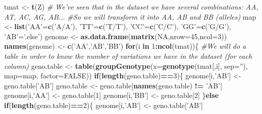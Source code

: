\documentclass[]{article}
\newenvironment{Shaded}{\begin{snugshade}}{\end{snugshade}}
\newcommand{\KeywordTok}[1]{\textcolor[rgb]{0.13,0.29,0.53}{\textbf{#1}}}
\newcommand{\DataTypeTok}[1]{\textcolor[rgb]{0.13,0.29,0.53}{#1}}
\newcommand{\DecValTok}[1]{\textcolor[rgb]{0.00,0.00,0.81}{#1}}
\newcommand{\StringTok}[1]{\textcolor[rgb]{0.31,0.60,0.02}{#1}}
\newcommand{\CommentTok}[1]{\textcolor[rgb]{0.56,0.35,0.01}{\textit{#1}}}
\newcommand{\OtherTok}[1]{\textcolor[rgb]{0.56,0.35,0.01}{#1}}
\newcommand{\ControlFlowTok}[1]{\textcolor[rgb]{0.13,0.29,0.53}{\textbf{#1}}}
\newcommand{\OperatorTok}[1]{\textcolor[rgb]{0.81,0.36,0.00}{\textbf{#1}}}
\newcommand{\NormalTok}[1]{#1}
\begin{document}
\begin{Shaded}
\begin{Highlighting}[]
\NormalTok{tmat <-}\StringTok{ }\KeywordTok{t}\NormalTok{(Z)}
\CommentTok{# We've seen that in the dataset we have several combinations: AA, AT, AC, AG, AB...}
\CommentTok{#So we will transform it into AA, AB and BB (alleles)}
\NormalTok{map <-}\StringTok{ }\KeywordTok{list}\NormalTok{(}\StringTok{'AA'}\NormalTok{=}\KeywordTok{c}\NormalTok{(}\StringTok{'A/A'}\NormalTok{), }\StringTok{'TT'}\NormalTok{=}\KeywordTok{c}\NormalTok{(}\StringTok{'T/T'}\NormalTok{), }\StringTok{'CC'}\NormalTok{=}\KeywordTok{c}\NormalTok{(}\StringTok{'C/C'}\NormalTok{), }\StringTok{'GG'}\NormalTok{=}\KeywordTok{c}\NormalTok{(}\StringTok{'G/G'}\NormalTok{), }\StringTok{'AB'}\NormalTok{=}\StringTok{'.else'}\NormalTok{)}
\NormalTok{genome <-}\StringTok{ }\KeywordTok{as.data.frame}\NormalTok{(}\KeywordTok{matrix}\NormalTok{(}\OtherTok{NA}\NormalTok{,}\DataTypeTok{nrow=}\DecValTok{45}\NormalTok{,}\DataTypeTok{ncol=}\DecValTok{3}\NormalTok{))}
\KeywordTok{names}\NormalTok{(genome) <-}\StringTok{ }\KeywordTok{c}\NormalTok{(}\StringTok{'AA'}\NormalTok{,}\StringTok{'AB'}\NormalTok{,}\StringTok{'BB'}\NormalTok{)}
\ControlFlowTok{for}\NormalTok{(i }\ControlFlowTok{in} \DecValTok{1}\OperatorTok{:}\KeywordTok{ncol}\NormalTok{(tmat))\{}
  \CommentTok{#We will do a table in order to know the number of variations we have in the dataset (for each column)}
\NormalTok{  geno.table <-}\StringTok{ }\KeywordTok{table}\NormalTok{(}\KeywordTok{groupGenotype}\NormalTok{(}\DataTypeTok{x=}\KeywordTok{genotype}\NormalTok{(tmat[,i], }\DataTypeTok{sep=}\StringTok{''}\NormalTok{), }\DataTypeTok{map=}\NormalTok{map, }\DataTypeTok{factor=}\OtherTok{FALSE}\NormalTok{))}
  \ControlFlowTok{if}\NormalTok{(}\KeywordTok{length}\NormalTok{(geno.table)}\OperatorTok{==}\DecValTok{3}\NormalTok{)\{}
\NormalTok{    genome[i,}\StringTok{'AB'}\NormalTok{] <-}\StringTok{ }\NormalTok{geno.table[}\StringTok{'AB'}\NormalTok{]  }
\NormalTok{    geno.table <-}\StringTok{ }\NormalTok{geno.table[}\KeywordTok{names}\NormalTok{(geno.table) }\OperatorTok{!=}\StringTok{ 'AB'}\NormalTok{]}
\NormalTok{    genome[i,}\StringTok{'AA'}\NormalTok{] <-}\StringTok{ }\NormalTok{geno.table[}\DecValTok{1}\NormalTok{]}
\NormalTok{    genome[i,}\StringTok{'BB'}\NormalTok{] <-}\StringTok{ }\NormalTok{geno.table[}\DecValTok{2}\NormalTok{]}
\NormalTok{  \}}\ControlFlowTok{else} \ControlFlowTok{if}\NormalTok{(}\KeywordTok{length}\NormalTok{(geno.table)}\OperatorTok{==}\DecValTok{2}\NormalTok{)\{}
\NormalTok{    genome[i,}\StringTok{'AB'}\NormalTok{] <-}\StringTok{ }\NormalTok{geno.table[}\StringTok{'AB'}\NormalTok{]  }

\end{Highlighting}
\end{Shaded}
\end{document}

